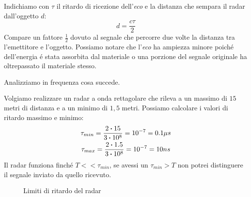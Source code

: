                 Indichiamo con $\tau$ il ritardo di ricezione dell'{\em eco} e la distanza che sempara il radar dall'oggetto $d$:
                \[
                    d=\frac{c\tau}{2}
                \]
                Compare un fattore $\frac{1}{2}$ dovuto al segnale che percorre due volte la distanza tra l'emettitore e l'oggetto.
                Possiamo notare che l'{\em eco} ha ampiezza minore poiché dell'energia é stata assorbita dal materiale o una porzione del segnale
                originale ha oltrepassato il materiale stesso.
                
                Analizziamo in frequenza cosa succede. 
                
                Volgiamo realizzare un radar a onda rettagolare che rileva a un massimo di $15$ metri di distanza e a un minimo di $1,5$ metri.
                Possiamo calcolare i valori di ritardo massimo e minimo:
                \begin{gather}
                    \tau_{min} =\frac{2\dotproduct 15}{3\dotproduct 10^8} =10^{-7} = 0.1\mu s  \nonumber\\
                    \tau_{max} =\frac{2\dotproduct 1.5}{3\dotproduct 10^8} =10^{-7} = 10 ns\nonumber
                \end{gather}  
                Il radar funziona finché $T<<\tau_{min}$, se avessi un $\tau_{min}>T$ non potrei distinguere il segnale inviato da quello ricevuto.  
                \begin{figure}[H]
                    \centering
                    \caption{Limiti di ritardo del radar}
                    \label{fig:radar rettangolare limiti}
                \end{figure}    
                

